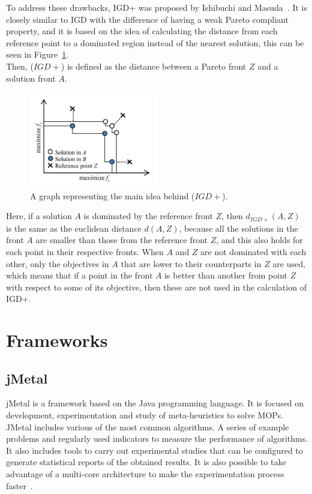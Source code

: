 To address these drawbacks, IGD+ was proposed by Ishibuchi and Masuda~\cite{ishibuchi2015study}. It is closely similar to IGD with the difference of having a weak Pareto compliant property, and it is based on the idea of calculating the distance from each reference point to a dominated region instead of the nearest solution, this can be seen in Figure~\ref{fig:igd_comp_3}.\\

Then, ($IGD+$) is defined as the distance between a Pareto front $Z$ and a solution front $A$.

\begin{figure}[H]
    \centering
    \includegraphics[width=0.5\textwidth]{images/igd_comp_3.png}
    \caption{A graph representing the main idea behind ($IGD+$).}
    \label{fig:igd_comp_3}
\end{figure}

Here, if a solution $A$ is dominated by the reference front $Z$, then $d_{IGD+}(A,Z)$ is the same as the euclidean distance $d(A,Z)$, because all the solutions in the front $A$ are smaller than those from the reference front $Z$, and this also holds for each point in their respective fronts. When $A$ and $Z$ are not dominated with each other, only the objectives in $A$ that are lower to their counterparts in $Z$ are used, which means that if a point in the front $A$ is better than another from point $Z$ with respect to some of its objective, then these are not used in the calculation of IGD+.\\

\section{Frameworks}
\subsection{jMetal}

jMetal is a framework based on the Java programming language. It is focused on development, experimentation and study of meta-heuristics to solve MOPs. JMetal includes various of the most common algorithms. A series of example problems and regularly used indicators to measure the performance of algorithms. It also includes tools to carry out experimental studies that can be configured to generate statistical reports of the obtained results. It is also possible to take advantage of a multi-core architecture to make the experimentation process faster~\cite{durillo2011jmetal}.\\

